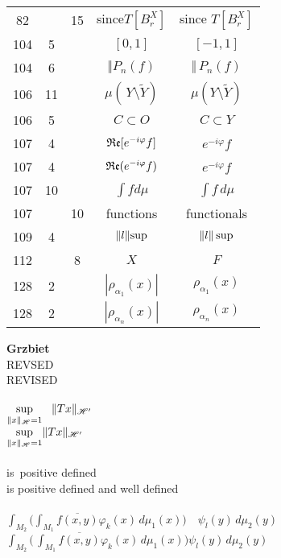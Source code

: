 \documentclass[a4paper,11pt]{article}
\begin{document}
\begin{center}
\begin{tabular}{|c|c|c|c|c|}
    82  & & 15 & since$T[ B_{ r }^{ X } ]$ & since $T[ B_{ r }^{ X } ]$ \\
    104 &  5 & & $[ 0, 1 ]$ & $[ -1, 1 ]$ \\
    104 &  6 & & $\Vert P_{ n }( f )$ & $\Vert \, P_{ n }( f )$ \\
    106 & 11 & & $\mu( \, Y \setminus \widetilde{ Y } )$
           & $\mu( Y \setminus \widetilde{ Y } )$ \\
    106 &  5 & & $C \subset O$ & $C \subset Y$ \\
    107 &  4 & & $\operatorname{\mathfrak{Re}}[ e^{ -i \varphi } f ]$ & $e^{ -i \varphi } f$ \\
    107 &  4 & & $\operatorname{\mathfrak{Re}}( e^{ -i \varphi } f )$ & $e^{ -i \varphi } f$ \\
    107 & 10 & & $\int\! fd\mu$ & $\int f \, d\mu$ \\
    107 & & 10 & functions & functionals \\
    109 & 4 & & $\lVert{  l  }\rVert\!\sup$ & $\lVert{  l  }\rVert \sup$ \\
    112 & & 8 & $X$ & $F$ \\
    128 & 2 & & $| \rho_{ \alpha_{ 1 } }( x ) |$ & $\rho_{ \alpha_{ 1 } }( x )$ \\
    128 & 2 & & $| \rho_{ \alpha_{ n } }( x ) |$ & $\rho_{ \alpha_{ n } }( x )$ \\
    \hline
  \end{tabular}

\end{center}


\noindent
\textbf{Grzbiet} \\
\Jest  REVSED \\
\Powin REVISED \\
 \\
\Jest
$\displaystyle \sup_{ \substack{ \lVert{  x  }\rVert_{ \mathcal{H} } = 1 } } \;\;\;
\lVert{  T x  }\rVert_{ \mathcal{H}' }$ \\[0.4em]
\Powin
$\displaystyle \sup_{ \substack{ \lVert{  x  }\rVert_{ \mathcal{H} } = 1 } }
\lVert{  T x  }\rVert_{ \mathcal{H}' }$ \\[0.4em]
 \\
\Jest  is~positive defined \\
\Powin is positive defined and well defined \\
 \\
\Jest
$\displaystyle \int_{ M_{ 2 } } \bigg( \int_{ M_{ 1 } }
\overline{ f( x, y ) } \varphi_{ k }( x ) \,
d\mu_{ 1 }( x ) \bigg) \quad \psi_{ l }( y ) \, d\mu_{ 2 }( y )$ \\
\Powin
$\displaystyle \int_{ M_{ 2 } } \bigg( \, \int_{ M_{ 1 } }
\overline{ f( x, y ) } \varphi_{ k }( x ) \, d\mu_{ 1 }( x ) \bigg)
\psi_{ l }( y ) \, d\mu_{ 2 }( y )$
\end{document}
